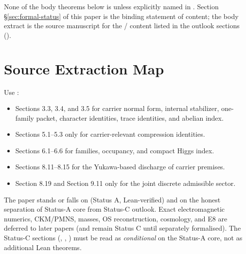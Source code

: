 \begin{tfptwarningbox}
\smallskip
None of the body theorems below is  unless explicitly
named in . Section
\S\ref{sec:formal-status} of this paper is the binding
statement of  content; the body extract is the source
manuscript for the  /  content listed in the
 outlook sections
().
\end{tfptwarningbox}

\tfptDraftXrefNotice



\section{Source Extraction Map}

\begin{tfptsourcebox}
Use \sourceDraft:
\begin{itemize}[leftmargin=1.5em]
    \item Sections 3.3, 3.4, and 3.5 for carrier normal form, internal stabilizer, one-family
    packet, character identities, trace identities, and abelian index.
    \item Sections 5.1--5.3 only for carrier-relevant compression identities.
    \item Sections 6.1--6.6 for families, occupancy, and compact Higgs index.
    \item Sections 8.11--8.15 for the Yukawa-based discharge of carrier premises.
    \item Section 8.19 and Section 9.11 only for the joint discrete admissible sector.
\end{itemize}
\end{tfptsourcebox}

\begin{tfptwarningbox}
The paper stands or falls on  (Status A, Lean-verified) and on the
honest separation of Status-A core from Status-C outlook. Exact electromagnetic numerics,
CKM/PMNS, masses, OS reconstruction, cosmology, and E8 are deferred to later papers (and remain
Status C until separately formalised). The Status-C sections (,
, ) must be read as
\emph{conditional} on the Status-A core, not as additional Lean theorems.
\end{tfptwarningbox}


